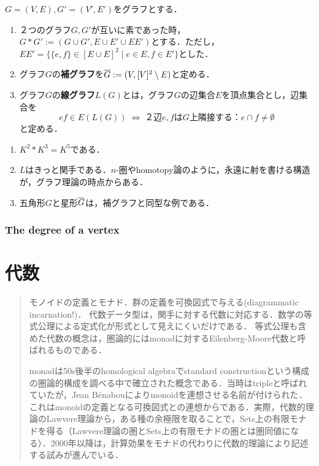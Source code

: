 \documentclass[uplatex,dvipdfmx]{jsreport}
\begin{document}
\begin{definition}
    $G=(V,E),G'=(V',E')$をグラフとする．
    \begin{enumerate}
        \item ２つのグラフ$G,G'$が互いに素であった時，$G*G':=(G\cup G',E\cup E'\cup EE')$とする．ただし，$EE'=\{\{e,f\}\in[E\cup E]^2\mid e\in E,f\in E'\}$とした．
        \item グラフ$G$の\textbf{補グラフ}を$\overline{G}:=(V,[V]^2\setminus E)$と定める．
        \item グラフ$G$の\textbf{線グラフ}$L(G)$とは，グラフ$G$の辺集合$E$を頂点集合とし，辺集合を
        \[ef\in E(L(G))\;\Leftrightarrow\; ２辺e,fはG上隣接する：e\cap f\ne\emptyset\]
        と定める．
    \end{enumerate}
\end{definition}
\begin{example}\mbox{}
    \begin{enumerate}
        \item $K^2*K^3=K^5$である．
        \item $L$はきっと関手である．$n$-圏やhomotopy論のように，永遠に射を書ける構造が，グラフ理論の時点からある．
        \item 五角形$G$と星形$\overline{G}$は，補グラフと同型な例である．
    \end{enumerate}
\end{example}

\subsection{The degree of a vertex}

\chapter{代数}

\begin{quotation}
    モノイドの定義とモナド．群の定義を可換図式で与える(diagrammatic incarnation!)．
    代数データ型は，関手に対する代数に対応する．数学の等式公理による定式化が形式として見えにくいだけである．
    等式公理も含めた代数の概念は，圏論的にはmonadに対するEilenberg-Moore代数と呼ばれるものである．

    monadは50s後半のhomological algebraでstandard constructionという構成の圏論的構成を調べる中で確立された概念である．当時はtripleと呼ばれていたが，Jean Bénabouによりmonoidを連想させる名前が付けられた．これはmonoidの定義となる可換図式との連想からである．実際，代数的理論のLawvere理論から，ある種の余極限を取ることで，Sets上の有限モナドを得る（Lawvere理論の圏とSets上の有限モナドの圏とは圏同値になる）．2000年以降は，計算効果をモナドの代わりに代数的理論により記述する試みが進んでいる．
\end{quotation}
\end{document}
